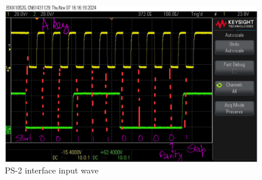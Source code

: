 \begin{figure}[htbp]
    \includegraphics[width=14cm, keepaspectratio]{figures/ps2wav.png}
    \caption{PS-2 interface input wave}
    \label{fig:fig9}
\end{figure}